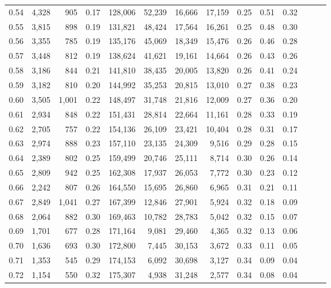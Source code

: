 \begin{tabular}{rrrrrrrrrrrrrr}
0.54 &  4,328 &    905 &  0.17 &  128,006 &   52,239 &  16,666 &  17,159 &  0.25 &  0.51 &      0.32 \\
0.55 &  3,815 &    898 &  0.19 &  131,821 &   48,424 &  17,564 &  16,261 &  0.25 &  0.48 &      0.30 \\
0.56 &  3,355 &    785 &  0.19 &  135,176 &   45,069 &  18,349 &  15,476 &  0.26 &  0.46 &      0.28 \\
0.57 &  3,448 &    812 &  0.19 &  138,624 &   41,621 &  19,161 &  14,664 &  0.26 &  0.43 &      0.26 \\
0.58 &  3,186 &    844 &  0.21 &  141,810 &   38,435 &  20,005 &  13,820 &  0.26 &  0.41 &      0.24 \\
0.59 &  3,182 &    810 &  0.20 &  144,992 &   35,253 &  20,815 &  13,010 &  0.27 &  0.38 &      0.23 \\
0.60 &  3,505 &  1,001 &  0.22 &  148,497 &   31,748 &  21,816 &  12,009 &  0.27 &  0.36 &      0.20 \\
0.61 &  2,934 &    848 &  0.22 &  151,431 &   28,814 &  22,664 &  11,161 &  0.28 &  0.33 &      0.19 \\
0.62 &  2,705 &    757 &  0.22 &  154,136 &   26,109 &  23,421 &  10,404 &  0.28 &  0.31 &      0.17 \\
0.63 &  2,974 &    888 &  0.23 &  157,110 &   23,135 &  24,309 &   9,516 &  0.29 &  0.28 &      0.15 \\
0.64 &  2,389 &    802 &  0.25 &  159,499 &   20,746 &  25,111 &   8,714 &  0.30 &  0.26 &      0.14 \\
0.65 &  2,809 &    942 &  0.25 &  162,308 &   17,937 &  26,053 &   7,772 &  0.30 &  0.23 &      0.12 \\
0.66 &  2,242 &    807 &  0.26 &  164,550 &   15,695 &  26,860 &   6,965 &  0.31 &  0.21 &      0.11 \\
0.67 &  2,849 &  1,041 &  0.27 &  167,399 &   12,846 &  27,901 &   5,924 &  0.32 &  0.18 &      0.09 \\
0.68 &  2,064 &    882 &  0.30 &  169,463 &   10,782 &  28,783 &   5,042 &  0.32 &  0.15 &      0.07 \\
0.69 &  1,701 &    677 &  0.28 &  171,164 &    9,081 &  29,460 &   4,365 &  0.32 &  0.13 &      0.06 \\
0.70 &  1,636 &    693 &  0.30 &  172,800 &    7,445 &  30,153 &   3,672 &  0.33 &  0.11 &      0.05 \\
0.71 &  1,353 &    545 &  0.29 &  174,153 &    6,092 &  30,698 &   3,127 &  0.34 &  0.09 &      0.04 \\
0.72 &  1,154 &    550 &  0.32 &  175,307 &    4,938 &  31,248 &   2,577 &  0.34 &  0.08 &      0.04 \\

\end{tabular}
